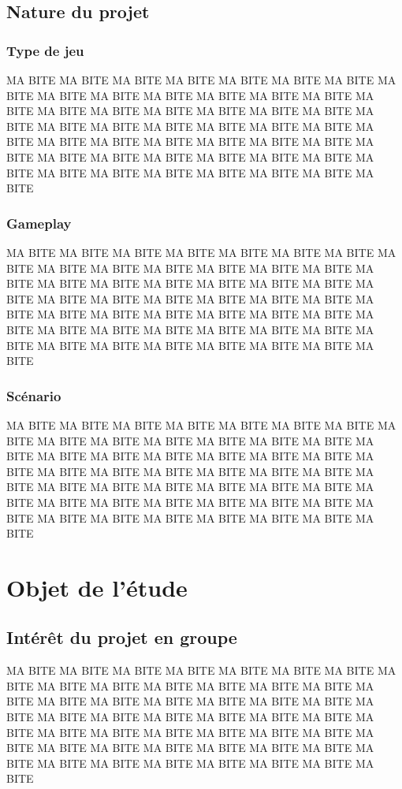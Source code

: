 \documentclass[12pt,a4paper]{article}
\begin{document}
\subsection{Nature du projet}
\subsubsection{Type de jeu}
MA BITE MA BITE MA BITE MA BITE MA BITE MA BITE MA BITE MA BITE MA BITE MA BITE 
MA BITE MA BITE MA BITE MA BITE MA BITE MA BITE MA BITE MA BITE MA BITE MA BITE 
MA BITE MA BITE MA BITE MA BITE MA BITE MA BITE MA BITE MA BITE MA BITE MA BITE 
MA BITE MA BITE MA BITE MA BITE MA BITE MA BITE MA BITE MA BITE MA BITE MA BITE 
MA BITE MA BITE MA BITE MA BITE MA BITE MA BITE MA BITE MA BITE MA BITE MA BITE 
\subsubsection{Gameplay}
MA BITE MA BITE MA BITE MA BITE MA BITE MA BITE MA BITE MA BITE MA BITE MA BITE 
MA BITE MA BITE MA BITE MA BITE MA BITE MA BITE MA BITE MA BITE MA BITE MA BITE 
MA BITE MA BITE MA BITE MA BITE MA BITE MA BITE MA BITE MA BITE MA BITE MA BITE 
MA BITE MA BITE MA BITE MA BITE MA BITE MA BITE MA BITE MA BITE MA BITE MA BITE 
MA BITE MA BITE MA BITE MA BITE MA BITE MA BITE MA BITE MA BITE MA BITE MA BITE 
\subsubsection{Scénario}
MA BITE MA BITE MA BITE MA BITE MA BITE MA BITE MA BITE MA BITE MA BITE MA BITE 
MA BITE MA BITE MA BITE MA BITE MA BITE MA BITE MA BITE MA BITE MA BITE MA BITE 
MA BITE MA BITE MA BITE MA BITE MA BITE MA BITE MA BITE MA BITE MA BITE MA BITE 
MA BITE MA BITE MA BITE MA BITE MA BITE MA BITE MA BITE MA BITE MA BITE MA BITE 
MA BITE MA BITE MA BITE MA BITE MA BITE MA BITE MA BITE MA BITE MA BITE MA BITE 

\newpage
\section{Objet de l'étude}
\subsection{Intérêt du projet en groupe}
MA BITE MA BITE MA BITE MA BITE MA BITE MA BITE MA BITE MA BITE MA BITE MA BITE 
MA BITE MA BITE MA BITE MA BITE MA BITE MA BITE MA BITE MA BITE MA BITE MA BITE 
MA BITE MA BITE MA BITE MA BITE MA BITE MA BITE MA BITE MA BITE MA BITE MA BITE 
MA BITE MA BITE MA BITE MA BITE MA BITE MA BITE MA BITE MA BITE MA BITE MA BITE 
MA BITE MA BITE MA BITE MA BITE MA BITE MA BITE MA BITE MA BITE MA BITE MA BITE 
\end{document}
